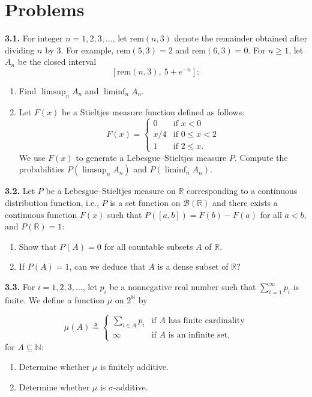 \section*{Problems}

\textbf{3.1.} For integer $n = 1, 2, 3, \dots$, let $\text{rem}(n, 3)$ denote the remainder obtained after dividing $n$ by 3. For example, $\text{rem}(5, 3) = 2$ and $\text{rem}(6, 3) = 0$. For $n \ge 1$, let $A_n$ be the closed interval
\[
[\text{rem}(n, 3), \ 5 + e^{-n}] :
\]
\begin{enumerate}
    \item Find $\limsup_n A_n$ and $\liminf_n A_n$.
    \item Let $F(x)$ be a Stieltjes measure function defined as follows:
    \[
    F(x) = \begin{cases} 
    0 & \text{if } x < 0 \\ 
    x/4 & \text{if } 0 \le x < 2 \\ 
    1 & \text{if } 2 \le x. 
    \end{cases}
    \]
    We use $F(x)$ to generate a Lebesgue--Stieltjes measure $P$. Compute the probabilities $P(\limsup_n A_n)$ and $P(\liminf_n A_n)$.
\end{enumerate}

\textbf{3.2.} Let $P$ be a Lebesgue--Stieltjes measure on $\mathbb{R}$ corresponding to a continuous distribution function, i.e., $P$ is a set function on $\mathcal{B}(\mathbb{R})$ and there exists a continuous function $F(x)$ such that $P([a, b]) = F(b) - F(a)$ for all $a < b$, and $P(\mathbb{R}) = 1$:
\begin{enumerate}
    \item Show that $P(A) = 0$ for all countable subsets $A$ of $\mathbb{R}$.
    \item If $P(A) = 1$, can we deduce that $A$ is a dense subset of $\mathbb{R}$?
\end{enumerate}

\textbf{3.3.} For $i = 1, 2, 3, \dots$, let $p_i$ be a nonnegative real number such that $\sum_{i=1}^\infty p_i$ is finite. We define a function $\mu$ on $2^{\mathbb{N}}$ by

\[
\mu(A) \triangleq \begin{cases} 
\sum_{i \in A} p_i & \text{if } A \text{ has finite cardinality} \\ 
\infty & \text{if } A \text{ is an infinite set,} 
\end{cases}
\]
for $A \subseteq \mathbb{N}$:
\begin{enumerate}[label=(\alph*)]
    \item Determine whether $\mu$ is finitely additive.
    \item Determine whether $\mu$ is $\sigma$-additive.
\end{enumerate}

